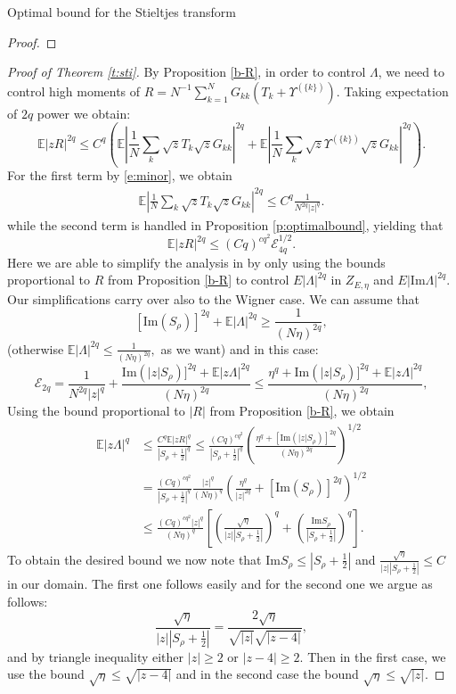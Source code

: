 \documentclass[11pt, a4paper, oneside]{book}
\numberwithin{equation}{chapter}
\newcommand{\E}{\mathbb E}
\begin{document}
\begin{section}{Optimal bound for the Stieltjes transform}
\begin{proof}
\end{proof}
%
\begin{proof}[Proof of Theorem \ref{t:sti}]
 By Proposition \ref{b-R}, in order to control $\Lambda$, we need to control high moments of $R=N^{-1} \sum \limits_{k=1}^N G_{kk}(T_k + \Upsilon^{(\{k\})})$. Taking expectation of $2q$  power we obtain:
\begin{equation}\label{e:Ypsilonpower}\E| z R|^{2q} \leq  C^q \left ( \E \left | \frac{1}{N} \sum \limits_k \sqrt{z} T_k \sqrt{z} G_{kk} \right |^{2q} + \E \left | \frac{1}{N} \sum \limits_k \sqrt{z} \Upsilon^{(\{k\})} \sqrt{z} G_{kk} \right |^{2q} \right )  .\end{equation}
%
For the first term by \eqref{e:minor}, we obtain
%
\begin{align} \label{4.1}
\E \left| \frac{1}{N} \sum \limits_{k} \sqrt{z}T_k \sqrt{z}G_{kk} \right|^{2q}\leq C^q \frac{1}{N^{2q} |z|^q} .
\end{align}
%
while the second term is handled in Proposition \ref{p:optimalbound}, yielding that
$$ \E|z R|^{2q} \leq (Cq)^{cq^2} \mathcal{E}_{4q}^{1/2}. $$
%
Here we are able to simplify the analysis in \cite{cacciapuoti2015bounds} by only using the bounds proportional to $R$ from Proposition \ref{b-R} to control $E|\Lambda|^{2q}$ in $Z_{E, \eta}$ and $E|\mathrm{Im}\Lambda|^{2q}$. Our simplifications carry over also to the Wigner case. We can assume that
%
$$[\mathrm{Im}( S_{\rho})]^{2q} + \E| \Lambda|^{2q} \geq \frac{1}{(N\eta)^{2q}} ,$$
%
(otherwise $\E | \Lambda|^{2q} \leq \frac{1}{(N\eta)^{2q}} ,$ as we want)
and in this case:
%
$$ \mathcal{E}_{2q} = \frac{1}{N^{2q} |z|^{q}} + \frac{\mathrm{Im} (|z| S_{\rho} )]^{2q} + \E |z \Lambda|^{2q}}{(N\eta)^{2q}} \leq \frac{\eta^q + \mathrm{Im} (|z| S_{\rho} )]^{2q} + \E |   z \Lambda|^{2q}}{(N\eta)^{2q}} ,$$
%
Using the bound proportional to $|R|$ from Proposition \ref{b-R}, we obtain
%
\begin{align*}
\E |z \Lambda|^q &\leq \frac{C^q \E| z R|^q}{|S_{\rho}+\frac{1}{2}|^q} \leq \frac{(Cq)^{cq^2}}{|S_{\rho}+\frac{1}{2}|^{q}} \left ( \frac{\eta^q + [\mathrm{Im} (|z|S_{\rho})]^{2q}}{(N\eta)^{2q}} \right)^{1/2} \\
&= \frac{(Cq)^{cq^2}}{|S_{\rho}+\frac{1}{2}|^q} \frac{|z|^q}{(N\eta)^q} \left ( \frac{\eta^q}{|z|^{2q}} + [\mathrm{Im} (S_{\rho})]^{2q} \right )^{1/2} \\
&\leq \frac{(Cq)^{cq^2} |z|^q } {(N\eta)^q} \left [ \left (\frac{\sqrt{\eta}}{|z| |S_{\rho}+\frac{1}{2}|} \right )^q+ \left ( \frac{\mathrm{Im} S_{\rho}}{|S_{\rho}+\frac{1}{2}|} \right )^q \right ].
\end{align*}
%
To obtain the desired bound we now note that
$\mathrm{Im} S_{\rho} \leq |S_{\rho}+\frac{1}{2}|$ and $\frac{\sqrt{\eta}}{|z| |S_{\rho}+\frac{1}{2}|} \leq C$ in our domain. The first one follows easily and for the second one we argue as follows:
%
$$ \frac{\sqrt{\eta}}{|z| |S_{\rho}+\frac{1}{2}|} = \frac{2\sqrt{\eta}}{\sqrt{|z|}\sqrt{|z-4|}} ,$$
%
and by triangle inequality either $|z|\geq 2$ or $|z-4|\geq 2$. Then in the first case, we use the bound $\sqrt{\eta} \leq \sqrt{|z-4|} $ and in the second case the bound $\sqrt{\eta} \leq \sqrt{|z|} $.


\end{proof}
\end{section}
\end{document}
